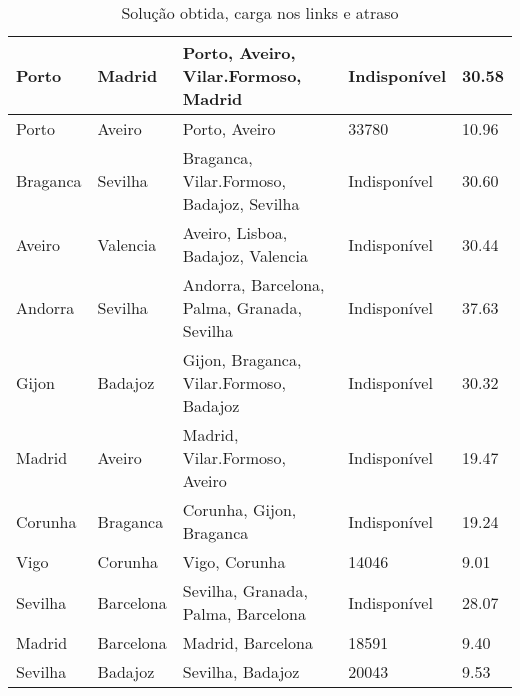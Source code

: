 \begin{table}[!htb]
{\begin{tabular}{|l|l|l|l|l|}
Porto & Madrid & Porto, Aveiro, Vilar.Formoso, Madrid & Indisponível & 30.58 \\ \hline
Porto & Aveiro & Porto, Aveiro & 33780 & 10.96 \\ \hline
Braganca & Sevilha & Braganca, Vilar.Formoso, Badajoz, Sevilha & Indisponível & 30.60 \\ \hline
Aveiro & Valencia & Aveiro, Lisboa, Badajoz, Valencia & Indisponível & 30.44 \\ \hline
Andorra & Sevilha & Andorra, Barcelona, Palma, Granada, Sevilha & Indisponível & 37.63 \\ \hline
Gijon & Badajoz & Gijon, Braganca, Vilar.Formoso, Badajoz & Indisponível & 30.32 \\ \hline
Madrid & Aveiro & Madrid, Vilar.Formoso, Aveiro & Indisponível & 19.47 \\ \hline
Corunha & Braganca & Corunha, Gijon, Braganca & Indisponível & 19.24 \\ \hline
Vigo & Corunha & Vigo, Corunha & 14046 & 9.01 \\ \hline
Sevilha & Barcelona & Sevilha, Granada, Palma, Barcelona & Indisponível & 28.07 \\ \hline
Madrid & Barcelona & Madrid, Barcelona & 18591 & 9.40 \\ \hline
Sevilha & Badajoz & Sevilha, Badajoz & 20043 & 9.53 \\ \hline
\end{tabular}}
\caption[]{Solução obtida, carga nos links e atraso}
\end{table}


